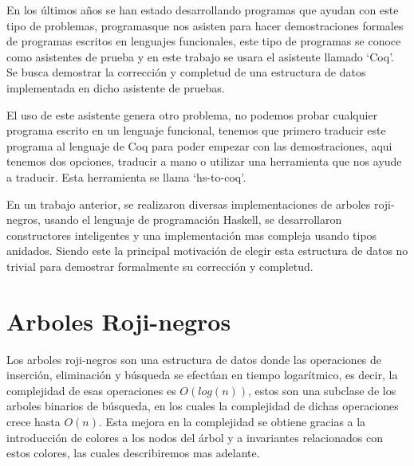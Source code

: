 \documentclass[8pt,leqno,pdflatex,spanish]{book}
\newcommand{\arns}{arboles roji-negros}
\theoremstyle{plain}
\theoremstyle{definition}
\theoremstyle{remark}
\begin{document}
En los últimos años se han estado desarrollando programas que ayudan con este tipo de problemas, 
programasque nos asisten para hacer demostraciones formales de programas escritos en lenguajes 
funcionales, este tipo de programas se conoce como asistentes de prueba y en este trabajo se usara 
el asistente llamado `Coq'. Se busca demostrar la corrección y completud de una estructura de 
datos implementada en dicho asistente de pruebas.

El uso de este asistente genera otro problema, no podemos probar cualquier programa escrito en un 
lenguaje funcional, tenemos que primero traducir este programa al lenguaje de Coq para poder 
empezar con las demostraciones, aqui tenemos dos opciones, traducir a mano o utilizar una 
herramienta que nos ayude a traducir. Esta herramienta se llama `hs-to-coq'\cite{thrc}.

En un trabajo anterior\cite{tesisG}, se realizaron diversas implementaciones de {\arns}, usando el 
lenguaje de programaci\'on Haskell, se desarrollaron constructores inteligentes y una 
implementaci\'on mas compleja usando tipos anidados. Siendo este la principal motivaci\'on de 
elegir esta estructura de datos no trivial para demostrar formalmente su corrección y completud. 

\section{Arboles Roji-negros}
Los {\arns} son una estructura de datos donde las operaciones de inserci\'on, eliminaci\'on y 
búsqueda se efectúan en tiempo logarítmico, es decir, la complejidad de esas operaciones es 
$O(log(n))$, estos son una subclase de los arboles binarios de búsqueda, en los cuales la 
complejidad de dichas operaciones crece hasta $O(n)$. Esta mejora en la complejidad se obtiene 
gracias a la introducción de colores a los nodos del \'arbol y a invariantes relacionados con 
estos colores, las cuales describiremos mas adelante.
\end{document}
